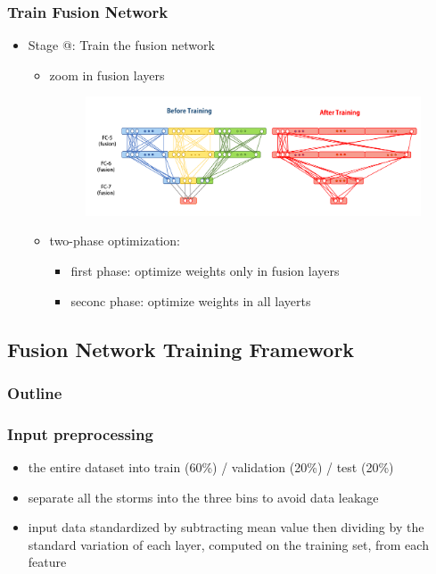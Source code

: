 \documentclass{beamer}
\makeatletter
\newcommand{\Rmnum}[1]{\expandafter\@slowromancap\romannumeral #1@}
\makeatother
\begin{document}
\begin{frame}
\frametitle{Train Fusion Network}
\begin{itemize}
	\item  Stage \Rmnum{2}: Train the fusion network \\
	\begin{itemize}
		\item  zoom in fusion layers
		\begin{figure}
			\flushleft
			\includegraphics[width=0.65\linewidth]{figs/fusion_details.pdf} \\
		\end{figure}
		\item two-phase optimization:
			\begin{itemize}
				\item first phase: optimize weights only in fusion layers
				\item seconc phase: optimize weights in all layerts
			\end{itemize}
	\end{itemize}
\end{itemize}
\end{frame}

\subsection{Fusion Network Training Framework}
\begin{frame}
\frametitle{Outline} %
\tableofcontents[currentsubsection] %
\end{frame}
\begin{frame}
\frametitle{Input preprocessing}
\begin{itemize}
	\item  the entire dataset into train (60\%) / validation (20\%) / test (20\%)
	\item separate all the storms into the three bins to avoid data leakage
	\item input data standardized by subtracting mean value then dividing by the standard variation of each layer, computed on the training set, from each feature
\end{itemize}
\end{frame}
\end{document}
